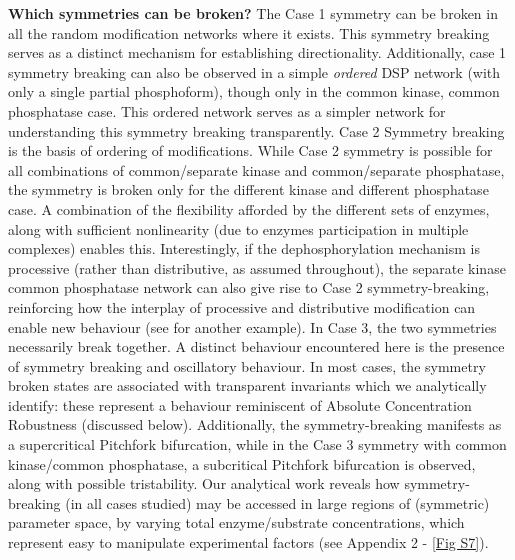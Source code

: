 \documentclass[9pt,lineno]{elife}
\begin{document}
{\bf Which symmetries can be broken?} The Case 1 symmetry can be broken in all the random modification networks where it exists. This symmetry breaking serves as a distinct mechanism for establishing directionality. Additionally, case 1 symmetry breaking can also be observed in a simple \textit{ordered} DSP network (with only a single partial phosphoform), though only in the common kinase, common phosphatase case. This ordered network serves as a simpler network for understanding this symmetry breaking transparently. Case 2 Symmetry breaking is the basis of ordering of modifications. While Case 2 symmetry is possible for all combinations of common/separate kinase and common/separate phosphatase, the symmetry is broken only for the different kinase and different phosphatase case. A combination of the flexibility afforded by the different sets of enzymes, along with sufficient nonlinearity (due to enzymes participation in multiple complexes) enables this.
Interestingly, if the dephosphorylation mechanism is processive (rather than distributive, as assumed throughout), the separate kinase common phosphatase network can also give rise to Case 2 symmetry-breaking, reinforcing how the interplay of processive and distributive modification can enable new behaviour (see \cite{Suwanmajo2015} for another example).
In Case 3, the two symmetries necessarily break together. A distinct behaviour encountered here is the presence of symmetry breaking and oscillatory behaviour. In most  cases, the symmetry broken states are associated with transparent invariants which we analytically identify: these represent a behaviour reminiscent of Absolute Concentration Robustness (discussed below). Additionally, the symmetry-breaking manifests as a supercritical Pitchfork bifurcation, while in the Case 3 symmetry with common kinase/common phosphatase, a subcritical Pitchfork bifurcation is observed, along with possible tristability.
Our analytical work reveals how symmetry-breaking (in all cases studied) may be accessed in large regions of (symmetric) parameter space, by varying total enzyme/substrate concentrations, which represent easy to manipulate experimental factors (see Appendix 2 - \cref{Fig S7}). 
\end{document}
